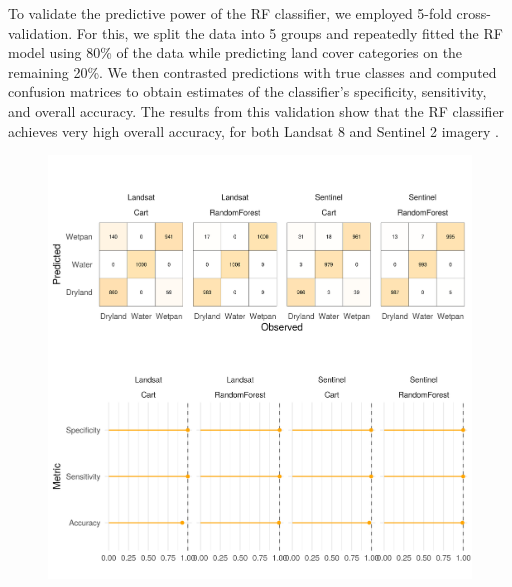 \documentclass[abstract=off,10pt,a4paper,bibliography=totocnumbered]{article}
\begin{document}
To validate the predictive power of the RF classifier, we employed 5-fold
cross-validation. For this, we split the data into 5 groups and repeatedly
fitted the RF model using 80\% of the data while predicting land cover
categories on the remaining 20\%. We then contrasted predictions with true
classes and computed confusion matrices to obtain estimates of the classifier's
specificity, sensitivity, and overall accuracy. The results from this validation
show that the RF classifier achieves very high overall accuracy, for both
Landsat 8 and Sentinel 2 imagery .

\begin{figure}[htbp]
 \begin{center}
  \includegraphics[width = \textwidth]{99_ClassificationValidation.png}
  \caption{}
  \label{ClassificationValidation}
 \end{center}
\end{figure}
\end{document}
